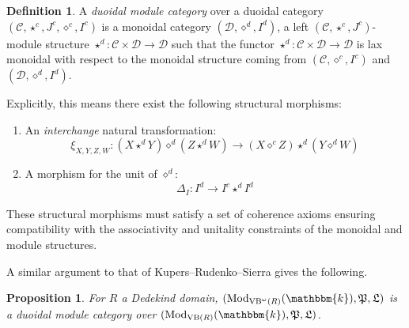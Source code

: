 \documentclass[11pt,letterpaper]{amsart}
\newcommand{\bk}{\mathbbm{k}}
\DeclareMathOperator{\Mod}{Mod}
\DeclareMathOperator{\VB}{VB}
\newcommand{\PP}{\mathfrak{P}}
\newcommand{\LL}{\mathfrak{L}}
\numberwithin{theoremcounter}{section}
\newtheorem{proposition}[propositionauto]{Proposition}
\theoremstyle{definition}
\newtheorem{definition}[Defauto]{Definition}
\theoremstyle{remark}
\begin{document}
\begin{definition}
A \emph{duoidal module category} over a duoidal category  $(\mathcal{C},  \star^c, J^c , \diamond^c, I^c)$ is a monoidal category $(\mathcal{D},\diamond^d, I^d)$, a left $(\mathcal{C},\star^c,J^c)$-module structure $\star^d \colon \mathcal{C} \times \mathcal{D} \to \mathcal{D}$ 
such that the functor $\star^d \colon \mathcal{C} \times \mathcal{D} \to \mathcal{D}$ 
is lax monoidal with respect to the monoidal structure coming from $(\mathcal{C}, \diamond^c, I^c)$ and $(\mathcal{D}, \diamond^d, I^d)$.

Explicitly, this means there exist the following structural morphisms:
\begin{enumerate}
    \item An \emph{interchange} natural transformation:
    \[ \xi_{X,Y,Z,W} \colon (X \star^d Y) \diamond^d (Z \star^d W) \longrightarrow (X \diamond^c Z) \star^d (Y \diamond^d W) \]
    
    \item A morphism for the unit of $\diamond^d$:
    \[ \Delta_I \colon I^d \longrightarrow I^c \star^d I^d \]
    
    
\end{enumerate}
\noindent These structural morphisms must satisfy a set of coherence axioms ensuring compatibility with the associativity and unitality constraints of the monoidal and module structures.
\end{definition}

A similar argument to that of Kupers--Rudenko--Sierra \cite{KRS1} gives the following.

\begin{proposition} \label{commutingGL}
For $R$ a Dedekind domain, $(\Mod_{\VB^\omega(R)}(\bk),\PP,\LL)$ is a duoidal module category over  $(\Mod_{\VB(R)}(\bk),\PP,\LL)$.
\end{proposition}
\end{document}
